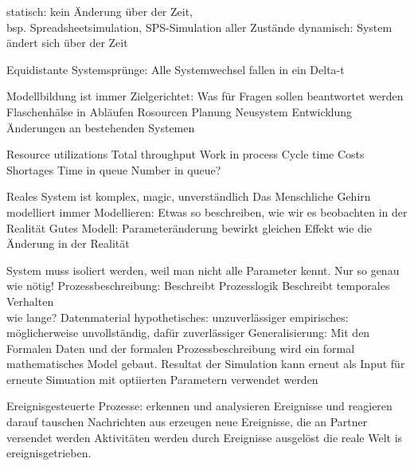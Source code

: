 \documentclass[ngerman,a4paper,12pt]{scrreprt}
\begin{document}
\ul
	\li statisch: kein Änderung über der Zeit, \\ bsp. Spreadsheetsimulation, SPS-Simulation aller Zustände
	\li dynamisch: System ändert sich über der Zeit
\ulE

\ul
	\li Equidistante Systemsprünge: Alle Systemwechsel fallen in ein Delta-t
\ulE


Modellbildung ist immer Zielgerichtet: Was für Fragen sollen beantwortet werden
\ul
	\li Flaschenhälse in Abläufen
	\li Rosourcen Planung
	\li Neusystem Entwicklung
	\li Änderungen an bestehenden Systemen
\ulE

\ul
	\li  Resource utilizations
 	\li Total throughput
 	\li Work in process
 	\li Cycle time
 	\li Costs
 	\li Shortages
 	\li Time in queue
 	\li Number in queue?
\ulE



\ul
	\li Reales System ist komplex, magic, unverständlich
	\li Das Menschliche Gehirn modelliert immer
	\li Modellieren: Etwas so beschreiben, wie wir es beobachten in der Realität
	\li Gutes Modell: Parameteränderung bewirkt gleichen Effekt wie die Änderung in der Realität
\ulE

\ul
	\li System muss isoliert werden, weil man nicht alle Parameter kennt.
	\li Nur so genau wie nötig!
	\li Prozessbeschreibung: 
		\ul
			\li Beschreibt Prozesslogik
			\li Beschreibt temporales Verhalten\\
				wie lange?
		\ulE
	\li Datenmaterial
		\ul
			\li hypothetisches: unzuverlässiger
			\li empirisches: möglicherweise unvollständig, dafür zuverlässiger
		\ulE
	\li Generalisierung: Mit den Formalen Daten und der formalen Prozessbeschreibung wird ein formal mathematisches Model gebaut.
	\li Resultat der Simulation kann erneut als Input für erneute Simuation mit optiierten Parametern verwendet werden
\ulE		



Ereignisgesteuerte Prozesse:
\ul
	\li erkennen und analysieren Ereignisse und reagieren darauf
	\li tauschen Nachrichten aus
	\li erzeugen neue Ereignisse, die an Partner versendet werden
	\li Aktivitäten werden durch Ereignisse ausgelöst
	\li die reale Welt is ereignisgetrieben.
\ulE
\end{document}
